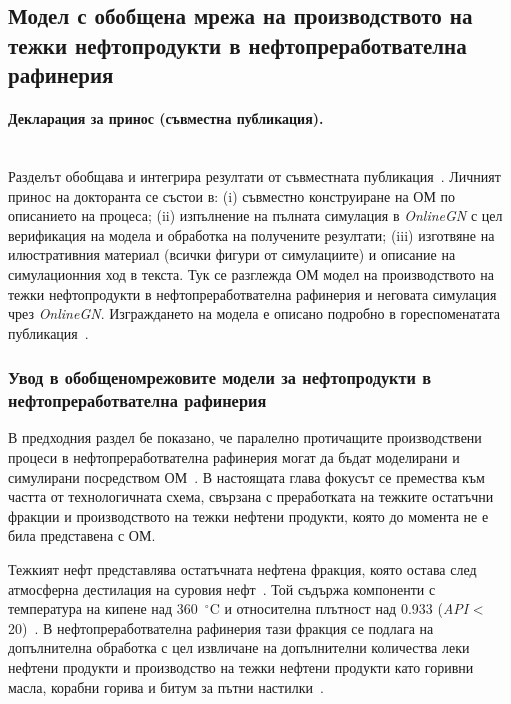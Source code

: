 \subsection{Модел с обобщена мрежа на производството на тежки нефтопродукти в нефтопреработвателна рафинерия}

\paragraph{Декларация за принос (съвместна публикация).}
\mbox{}\\
Разделът обобщава и интегрира резултати от съвместната публикация~\cite{Stratiev2023_2}.
Личният принос на докторанта се състои в: (i) съвместно конструиране на ОМ по описанието на процеса;
(ii) изпълнение на пълната симулация в \textit{OnlineGN} с цел верификация на модела и обработка на получените резултати;
(iii) изготвяне на илюстративния материал (всички фигури от симулациите) и описание на симулационния ход в текста.
\newpage
Тук се разглежда ОМ модел на производството на тежки нефтопродукти в нефтопреработвателна рафинерия и неговата симулация чрез \textit{OnlineGN}.
Изграждането на модела е описано подробно в гореспоменатата публикация~\cite{Stratiev2023_2}.

\subsubsection{Увод в обобщеномрежовите модели за нефтопродукти в нефтопреработвателна рафинерия}


\hspace*{2.5em}В предходния раздел бе показано, че паралелно протичащите производствени процеси в нефтопреработвателна рафинерия могат да бъдат моделирани и симулирани посредством ОМ~\cite{Z1}. В настоящата глава фокусът се премества към частта от технологичната схема, свързана с преработката на тежките остатъчни фракции и производството на тежки нефтени продукти, която до момента не е била представена с ОМ.

Тежкият нефт представлява остатъчната нефтена фракция, която остава след атмосферна дестилация на суровия нефт~\cite{96}. Той съдържа компоненти с температура на кипене над 360~$^\circ$C и относителна плътност над 0.933 (\textit{API} < 20)~\cite{97}. В нефтопреработвателна рафинерия тази фракция се подлага на допълнителна обработка с цел извличане на допълнителни количества леки нефтени продукти и производство на тежки нефтени продукти като горивни масла, корабни горива и битум за пътни настилки~\cite{98}.

